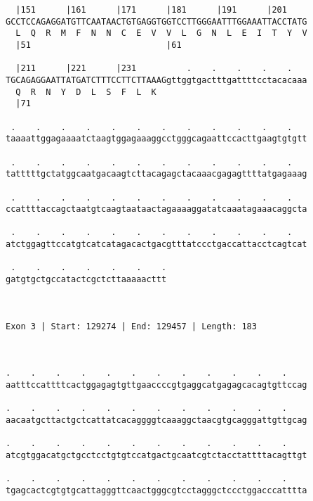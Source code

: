 \documentclass{article}
\begin{document}
\begin{Verbatim}
  |151      |161      |171      |181      |191      |201    
GCCTCCAGAGGATGTTCAATAACTGTGAGGTGGTCCTTGGGAATTTGGAAATTACCTATG
  L  Q  R  M  F  N  N  C  E  V  V  L  G  N  L  E  I  T  Y  V
  |51                           |61                         
  
  |211      |221      |231          .    .    .    .    .   
TGCAGAGGAATTATGATCTTTCCTTCTTAAAGgttggtgactttgattttcctacacaaa
  Q  R  N  Y  D  L  S  F  L  K                              
  |71                                                       
  
 .    .    .    .    .    .    .    .    .    .    .    .   
taaaattggagaaaatctaagtggagaaaggcctgggcagaattccacttgaagtgtgtt
                                                            
 .    .    .    .    .    .    .    .    .    .    .    .   
tatttttgctatggcaatgacaagtcttacagagctacaaacgagagttttatgagaaag
                                                            
 .    .    .    .    .    .    .    .    .    .    .    .   
ccattttaccagctaatgtcaagtaataactagaaaaggatatcaaatagaaacaggcta
                                                            
 .    .    .    .    .    .    .    .    .    .    .    .   
atctggagttccatgtcatcatagacactgacgtttatccctgaccattacctcagtcat
                                                            
 .    .    .    .    .    .    .
gatgtgctgccatactcgctcttaaaaacttt
                                
                                
 
Exon 3 | Start: 129274 | End: 129457 | Length: 183



.    .    .    .    .    .    .    .    .    .    .    .    
aatttccattttcactggagagtgttgaaccccgtgaggcatgagagcacagtgttccag
                                                            
.    .    .    .    .    .    .    .    .    .    .    .    
aacaatgcttactgctcattatcacaggggtcaaaggctaacgtgcagggattgttgcag
                                                            
.    .    .    .    .    .    .    .    .    .    .    .    
atcgtggacatgctgcctcctgtgtccatgactgcaatcgtctacctattttacagttgt
                                                            
.    .    .    .    .    .    .    .    .    .    .    .    
tgagcactcgtgtgcattagggttcaactgggcgtcctagggctccctggacccatttta
                                                            

\end{Verbatim}
\end{document}
